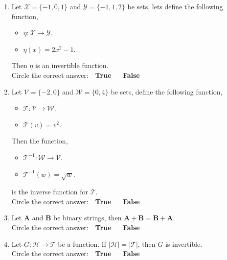 \documentclass[12pt]{article} %
\begin{document}
\begin{qstn}[1][(8 points)]
\begin{enumerate}
    \item Let $ \mathcal{X} = \{-1,0,1\} $ and $ \mathcal{Y} = \{-1,1,2\} $ be sets, lets define the
            following function, 
            \begin{itemize}
              \item $\mathcal{\eta} \colon \mathcal{X} \to \mathcal{Y}$.
              \item $\mathcal{\eta}(x) = 2x^2 - 1$.
            \end{itemize}
            Then $\eta$ is an invertible function.\\
          Circle the correct answer: \,\, \textbf{True} \,\,\,\,\,\, \textbf{False}
   \item Let $ \mathcal{V} = \{-2,0\} $ and $ \mathcal{W} = \{0,4\} $ be sets, 
              define the following function, 
              \begin{itemize}
                \item $\mathcal{T} \colon \mathcal{V} \to \mathcal{W}$.
                \item $\mathcal{T}(v) = v^2$.
              \end{itemize}
              Then the function,
              \begin{itemize}
                \item $\mathcal{T}^{-1} \colon \mathcal{W} \to \mathcal{V}$.
                \item $\mathcal{T}^{-1}(w) = \sqrt{w}$.
              \end{itemize}
              is the inverse function for $\mathcal{T}$.\\
      Circle the correct answer: \,\, \textbf{True} \,\,\,\,\,\, \textbf{False}


   \item Let $\textbf{A}$ and $\textbf{B}$ be binary strings, then $\textbf{A} + \textbf{B} = \textbf{B} +
        \textbf{A}$.\\
      Circle the correct answer: \,\, \textbf{True} \,\,\,\,\,\, \textbf{False}

    \item Let $G \colon \mathcal{H} \to \mathcal{T}$ be a function. If 
      $\left|\mathcal{H}\right| = \left|\mathcal{T}\right|$, then $G$ is invertible.\\
      Circle the correct answer: \,\, \textbf{True} \,\,\,\,\,\, \textbf{False}

  \end{enumerate}
\end{qstn}
\end{document}
